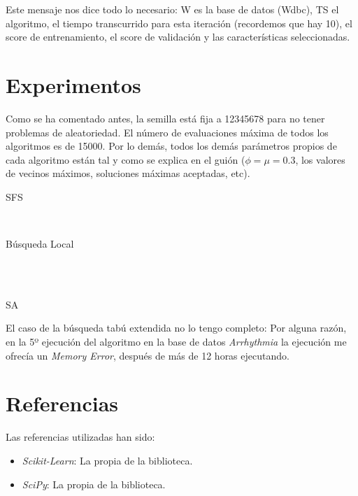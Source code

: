 \documentclass[a4paper, 11pt]{article}
\begin{document}
    Este mensaje nos dice todo lo necesario: W es la base de datos (Wdbc), TS el algoritmo, el tiempo transcurrido para esta iteración (recordemos que hay 10), el score de entrenamiento, el score de validación y las características seleccionadas.
  \section{Experimentos}
    Como se ha comentado antes, la semilla está fija a 12345678 para no tener problemas de aleatoriedad. El número de evaluaciones máxima de todos los algoritmos es de 15000. Por lo demás, todos los demás parámetros propios de cada algoritmo están tal y como se explica en el guión ($\phi=\mu=0.3$, los valores de vecinos máximos, soluciones máximas aceptadas, etc). \\

    \centerline{SFS}
    
    \\ \centerline{Búsqueda Local}
    \\
    \\ \centerline{SA}
    

    El caso de la búsqueda tabú extendida no lo tengo completo: Por alguna razón, en la 5º ejecución del algoritmo en la base de datos \emph{Arrhythmia} la ejecución me ofrecía un \emph{Memory Error}, después de más de 12 horas ejecutando.

  \section{Referencias}

  Las referencias utilizadas han sido:
  \begin{itemize}
    \item \emph{Scikit-Learn}: La propia  de la biblioteca.
    \item \emph{SciPy}: La propia  de la biblioteca.
  \end{itemize}
\end{document}
